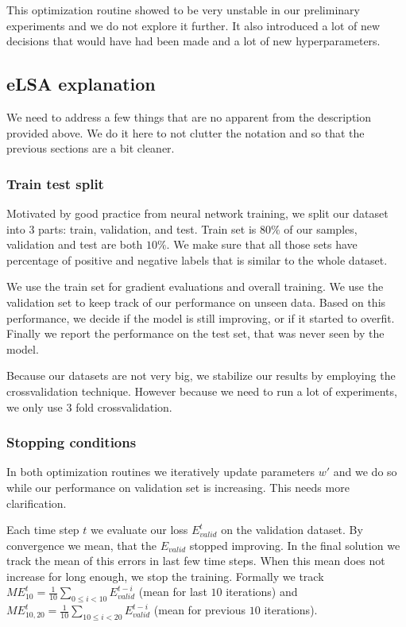     This optimization routine showed to be very unstable in our preliminary experiments and we do not explore it further.
    It also introduced a lot of new decisions that would have had been made and a lot of new hyperparameters.
    
    
    \subsection{eLSA explanation}
    We need to address a few things that are no apparent from the description provided above.
    We do it here to not clutter the notation and so that the previous sections are a bit cleaner. 
    
    \subsubsection{Train test split} \label{sec:train:test:split}
    
    Motivated by good practice from neural network training,
    we split our dataset into $3$ parts: train, validation, and test.
    Train set is $80\%$ of our samples, validation and test are both $10\%$.
    We make sure that all those sets have percentage of positive and negative labels that is similar to the whole dataset.
    
    We use the train set for gradient evaluations and overall training. 
    We use the validation set to keep track of our performance on unseen data.
    Based on this performance, we decide if the model is still improving, or if it started to overfit.
    Finally we report the performance on the test set, that was never seen by the model.
    
    Because our datasets are not very big, we stabilize our results by employing the crossvalidation technique.  
    However because we need to run a lot of experiments, we only use $3$ fold crossvalidation.
    
    \subsubsection{Stopping conditions} \label{sec:elsa:stopping}
    
    In both optimization routines we iteratively update parameters $w'$ and we do so while our performance on validation set is increasing.
    This needs more clarification.
    
    Each time step $t$ we evaluate our loss $E_{valid}^t$ on the validation dataset.
    By convergence we mean, that the $E_{valid}$ stopped improving.
    In the final solution we track the mean of this errors in last few time steps.
    When this mean does not increase for long enough, we stop the training. 
    Formally we track 
    $ME_{10}^t = \frac{1}{10} \sum_{0\leq i < 10} E_{valid}^{t-i}$ (mean for last $10$ iterations) and
    $ME_{10,20}^t = \frac{1}{10} \sum_{10\leq i < 20} E_{valid}^{t-i}$ (mean for previous $10$ iterations).
    
